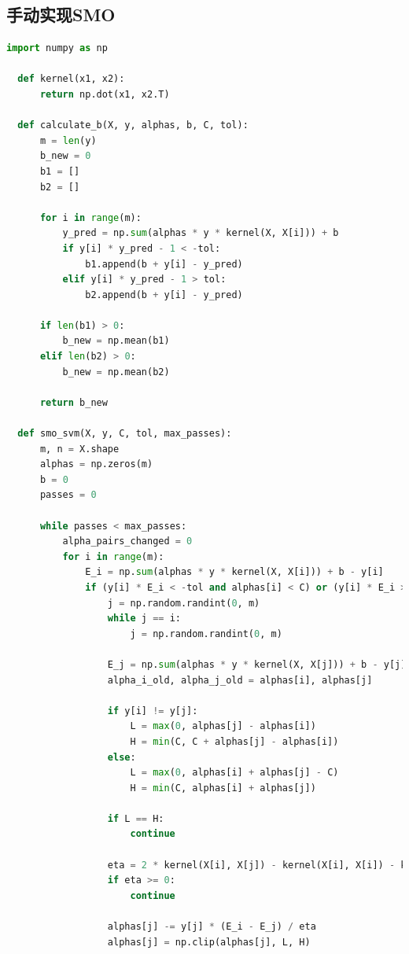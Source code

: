 \documentclass[12pt]{article}
\begin{document}
\subsection{手动实现SMO}
\begin{lstlisting}[language=Python]
  import numpy as np

  def kernel(x1, x2):
      return np.dot(x1, x2.T)
  
  def calculate_b(X, y, alphas, b, C, tol):
      m = len(y)
      b_new = 0
      b1 = []
      b2 = []
  
      for i in range(m):
          y_pred = np.sum(alphas * y * kernel(X, X[i])) + b
          if y[i] * y_pred - 1 < -tol:
              b1.append(b + y[i] - y_pred)
          elif y[i] * y_pred - 1 > tol:
              b2.append(b + y[i] - y_pred)
  
      if len(b1) > 0:
          b_new = np.mean(b1)
      elif len(b2) > 0:
          b_new = np.mean(b2)
  
      return b_new
  
  def smo_svm(X, y, C, tol, max_passes):
      m, n = X.shape
      alphas = np.zeros(m)
      b = 0
      passes = 0
  
      while passes < max_passes:
          alpha_pairs_changed = 0
          for i in range(m):
              E_i = np.sum(alphas * y * kernel(X, X[i])) + b - y[i]
              if (y[i] * E_i < -tol and alphas[i] < C) or (y[i] * E_i > tol and alphas[i] > 0):
                  j = np.random.randint(0, m)
                  while j == i:
                      j = np.random.randint(0, m)
  
                  E_j = np.sum(alphas * y * kernel(X, X[j])) + b - y[j]
                  alpha_i_old, alpha_j_old = alphas[i], alphas[j]
  
                  if y[i] != y[j]:
                      L = max(0, alphas[j] - alphas[i])
                      H = min(C, C + alphas[j] - alphas[i])
                  else:
                      L = max(0, alphas[i] + alphas[j] - C)
                      H = min(C, alphas[i] + alphas[j])
  
                  if L == H:
                      continue
  
                  eta = 2 * kernel(X[i], X[j]) - kernel(X[i], X[i]) - kernel(X[j], X[j])
                  if eta >= 0:
                      continue
  
                  alphas[j] -= y[j] * (E_i - E_j) / eta
                  alphas[j] = np.clip(alphas[j], L, H)
  

\end{lstlisting}
\end{document}
